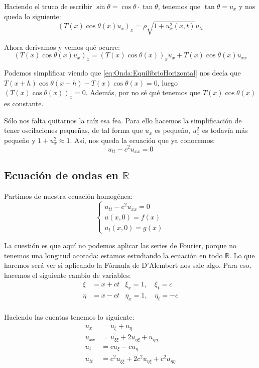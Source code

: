 		Haciendo el truco de escribir $\sin θ = \cos θ · \tan θ$, tenemos que $\tan θ = u_x$ y nos queda lo siguiente:  \[ \left(T(x) \cos θ(x) u_x \right)_x = ρ\sqrt{1+u_x^2(x,t)} u_{tt} \]

		Ahora derivamos y vemos qué ocurre: \[ \left(T(x) \cos θ(x) u_x \right)_x = \left(T(x) \cos θ(x)\right)_x u_x + T(x) \cos θ(x) u_{xx} \]

		Podemos simplificar viendo que \eqref{eq:Onda:EquilibrioHorizontal} nos decía que $T(x+h) \cos θ(x+h) - T(x) \cos θ(x) = 0$, luego $(T(x) \cos θ(x))_x = 0$. Además, por no sé qué tenemos que $T(x) \cos θ(x)$ es constante. %

		Sólo nos falta quitarnos la raíz esa fea. Para ello hacemos la simplificación de tener oscilaciones pequeñas, de tal forma que $u_x$ es pequeño, $u_x^2$ es todavía más pequeño y $1 + u_x^2 \approx 1$. Así, nos queda la ecuación que ya conocemos: \[ u_{tt} - c^2 u_{xx} = 0\]

		\subsection{Ecuación de ondas en $ℝ$}

		Partimos de nuestra ecuación homogénea: \[ \begin{cases}
		u_{tt} - c^2 u_{xx} = 0 \\
		u(x,0) = f(x) \\
		u_t(x, 0) = g(x)
		\end{cases}\]

		La cuestión es que aquí no podemos aplicar las series de Fourier, porque no tenemos una longitud acotada: estamos estudiando la ecuación en todo $ℝ$. Lo que haremos será ver si aplicando la Fórmula de D'Alembert nos sale algo. Para eso, hacemos el siguiente cambio de variables: \begin{align*}
		ξ &= x + ct & ξ_x = 1,\,& ξ_t = c \\
		η &= x - ct & η_x = 1,\,& η_t = - c \\
		\end{align*}

		Haciendo las cuentas tenemos lo siguiente: \begin{align*}
		u_x &= u_ξ + u_η \\
		u_{xx} &= u_{ξξ} + 2 u_{ηξ} + u_{ηη} \\
		u_t &= c u_ξ - c u_η \\
		u_{tt} &= c^2 u_{ξξ} + 2c^2 u_{ηξ} + c^2 u_{ηη}
		\end{align*}

